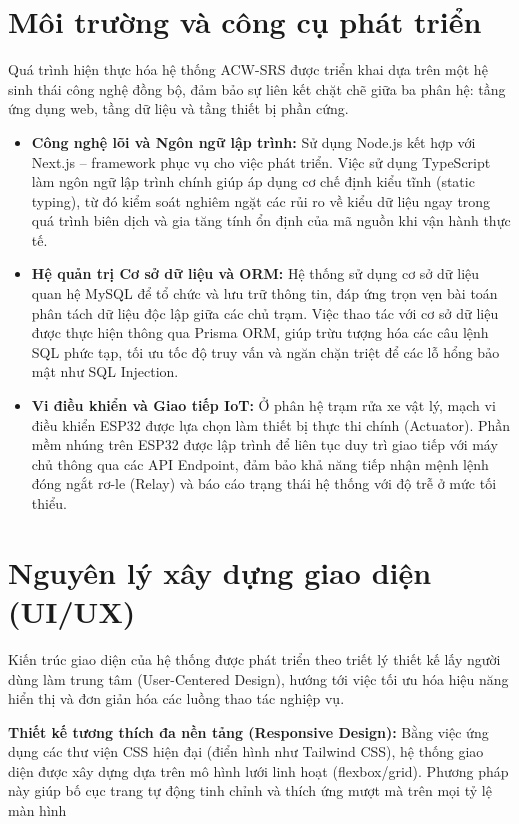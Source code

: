 \documentclass[../main.tex]{subfiles}
\begin{document}
\section{Môi trường và công cụ phát triển}

Quá trình hiện thực hóa hệ thống ACW-SRS được triển khai dựa trên một hệ sinh thái công nghệ đồng bộ, đảm bảo sự liên kết chặt chẽ giữa ba phân hệ: tầng ứng dụng web, tầng dữ liệu và tầng thiết bị phần cứng.
\begin{itemize}
    \item \textbf{Công nghệ lõi và Ngôn ngữ lập trình:} Sử dụng Node.js kết hợp với Next.js – framework phục vụ cho việc phát triển. Việc sử dụng TypeScript làm ngôn ngữ lập trình chính giúp áp dụng cơ chế định kiểu tĩnh (static typing), từ đó kiểm soát nghiêm ngặt các rủi ro về kiểu dữ liệu ngay trong quá trình biên dịch và gia tăng tính ổn định của mã nguồn khi vận hành thực tế.
    \item \textbf{Hệ quản trị Cơ sở dữ liệu và ORM:} Hệ thống sử dụng cơ sở dữ liệu quan hệ MySQL để tổ chức và lưu trữ thông tin, đáp ứng trọn vẹn bài toán phân tách dữ liệu độc lập giữa các chủ trạm. Việc thao tác với cơ sở dữ liệu được thực hiện thông qua Prisma ORM, giúp trừu tượng hóa các câu lệnh SQL phức tạp, tối ưu tốc độ truy vấn và ngăn chặn triệt để các lỗ hổng bảo mật như SQL Injection.
    \item \textbf{Vi điều khiển và Giao tiếp IoT:} Ở phân hệ trạm rửa xe vật lý, mạch vi điều khiển ESP32 được lựa chọn làm thiết bị thực thi chính (Actuator). Phần mềm nhúng trên ESP32 được lập trình để liên tục duy trì giao tiếp với máy chủ thông qua các API Endpoint, đảm bảo khả năng tiếp nhận mệnh lệnh đóng ngắt rơ-le (Relay) và báo cáo trạng thái hệ thống với độ trễ ở mức tối thiểu.
\end{itemize}

\section{Nguyên lý xây dựng giao diện (UI/UX)}

Kiến trúc giao diện của hệ thống được phát triển theo triết lý thiết kế lấy người dùng làm trung tâm (User-Centered Design), hướng tới việc tối ưu hóa hiệu năng hiển thị và đơn giản hóa các luồng thao tác nghiệp vụ.

\textbf{Thiết kế tương thích đa nền tảng (Responsive Design):} Bằng việc ứng dụng các thư viện CSS hiện đại (điển hình như Tailwind CSS), hệ thống giao diện được xây dựng dựa trên mô hình lưới linh hoạt (flexbox/grid). Phương pháp này giúp bố cục trang tự động tinh chỉnh và thích ứng mượt mà trên mọi tỷ lệ màn hình
\end{document}
